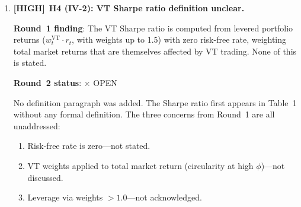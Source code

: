 \documentclass[12pt,a4paper]{article}
\newcommand{\HIGH}{\textbf{\textcolor{errorred}{[HIGH]}}}
\newcommand{\OPEN}{\textcolor{errorred}{$\times$ OPEN}}
\begin{document}
\begin{enumerate}
\textbf{Round~2 status}: \OPEN

The only reference added was Cole (2017) for the \$2T attribution fix. The reference count increased from 11 to 12. None of the six ABM/VT citations recommended in Round~1 were added:
\begin{enumerate}[label=(\alph*)]
  \item LeBaron (2006, \emph{Handbook of Computational Economics})---the standard ABM finance survey---\textbf{not cited}.
  \item Farmer \& Foley (2009, \emph{Nature})---the canonical advocacy for ABM in economics---\textbf{not cited}.
  \item Cederburg et al.\ (2020, \emph{Journal of Financial Economics})---comprehensive OOS test of VT---\textbf{not cited}.
  \item Danielsson et al.\ (2012, \emph{Journal of Financial Economics})---procyclical leverage / endogenous risk---\textbf{not cited}.
  \item Kinlaw et al.\ (2019, \emph{Journal of Portfolio Management})---quantitative crowding measures---\textbf{not cited}.
  \item Hommes (2006)---heterogeneous agent models survey---\textbf{not cited}.
\end{enumerate}

A paper with 12 references that spans ABM, VT, crowding, and market microstructure literatures will be rejected at any serious finance journal purely on the basis of incomplete literature engagement. Reviewers will view this as a failure to engage with the field.

\textbf{What is still needed}: Add at minimum LeBaron (2006), Farmer \& Foley (2009), and Cederburg et al.\ (2020). Target $\geq$ 20 references. \textbf{This remains HIGH severity.}

\medskip

\item \HIGH\ \textbf{H4 (IV-2): VT Sharpe ratio definition unclear.}

\textbf{Round~1 finding}: The VT Sharpe ratio is computed from levered portfolio returns ($w^{\text{VT}}_t \cdot r_t$, with weights up to 1.5) with zero risk-free rate, weighting total market returns that are themselves affected by VT trading. None of this is stated.

\textbf{Round~2 status}: \OPEN

No definition paragraph was added. The Sharpe ratio first appears in Table~1 without any formal definition. The three concerns from Round~1 are all unaddressed:
\begin{enumerate}[label=(\alph*)]
  \item Risk-free rate is zero---not stated.
  \item VT weights applied to total market return (circularity at high $\phi$)---not discussed.
  \item Leverage via weights $> 1.0$---not acknowledged.
\end{enumerate}


\end{enumerate}
\end{document}
